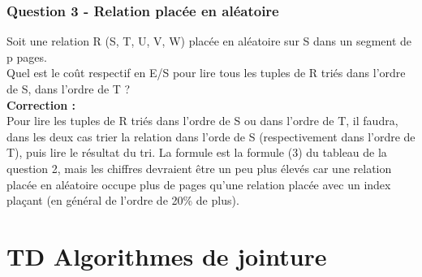 \documentclass[11pt]{article}
\begin{document}
\section{Question 3 - Relation placée en aléatoire}
Soit une relation R (S, T, U, V, W) placée en aléatoire sur S dans un segment de p pages. 
\\Quel est le coût respectif en E/S pour lire tous les tuples de R triés dans l'ordre de S, dans l'ordre de T ?\\
\textbf{Correction :}\\
Pour lire les tuples de R triés dans l'ordre de S ou dans l'ordre de T, il faudra, dans les deux cas trier la relation dans l'orde de S (respectivement dans l'ordre de T), puis lire le résultat du tri. La formule est la formule (3) du tableau de la question 2, mais les chiffres devraient être un peu plus élevés car une relation placée en aléatoire occupe plus de pages qu'une relation placée avec un index plaçant (en général de l'ordre de  20\% de plus).
\newpage
\part{TD Algorithmes de jointure}
\end{document}
